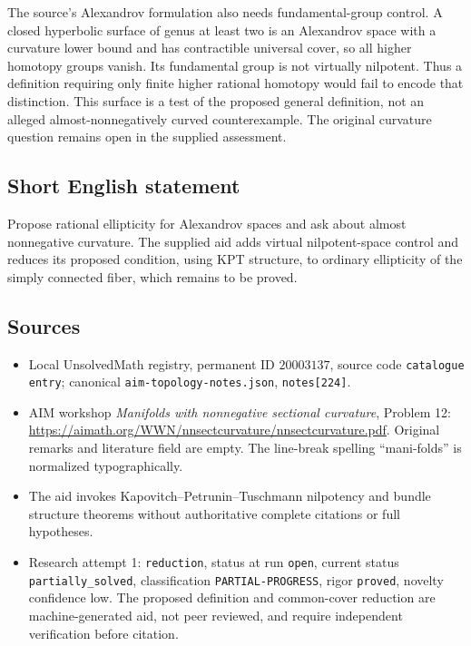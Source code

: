 \documentclass[11pt]{article}
\begin{document}
The source's Alexandrov formulation also needs fundamental-group control. A closed hyperbolic surface of genus at least two is an Alexandrov space with a curvature lower bound and has contractible universal cover, so all higher homotopy groups vanish. Its fundamental group is not virtually nilpotent. Thus a definition requiring only finite higher rational homotopy would fail to encode that distinction. This surface is a test of the proposed general definition, not an alleged almost-nonnegatively curved counterexample. The original curvature question remains open in the supplied assessment.
\subsection{Short English statement}
Propose rational ellipticity for Alexandrov spaces and ask about almost nonnegative curvature. The supplied aid adds virtual nilpotent-space control and reduces its proposed condition, using KPT structure, to ordinary ellipticity of the simply connected fiber, which remains to be proved.
\subsection{Sources}
\begin{itemize}
\item Local UnsolvedMath registry, permanent ID $20003137$, source code \texttt{catalogue entry}; canonical \texttt{aim-topology-notes.json}, \texttt{notes[224]}.
\item AIM workshop \emph{Manifolds with nonnegative sectional curvature}, Problem 12: \url{https://aimath.org/WWN/nnsectcurvature/nnsectcurvature.pdf}. Original remarks and literature field are empty. The line-break spelling ``mani-folds'' is normalized typographically.
\item The aid invokes Kapovitch--Petrunin--Tuschmann nilpotency and bundle structure theorems without authoritative complete citations or full hypotheses.
\item Research attempt 1: \texttt{reduction}, status at run \texttt{open}, current status \texttt{partially\_solved}, classification \texttt{PARTIAL-PROGRESS}, rigor \texttt{proved}, novelty confidence low. The proposed definition and common-cover reduction are machine-generated aid, not peer reviewed, and require independent verification before citation.
\end{itemize}
\end{document}
